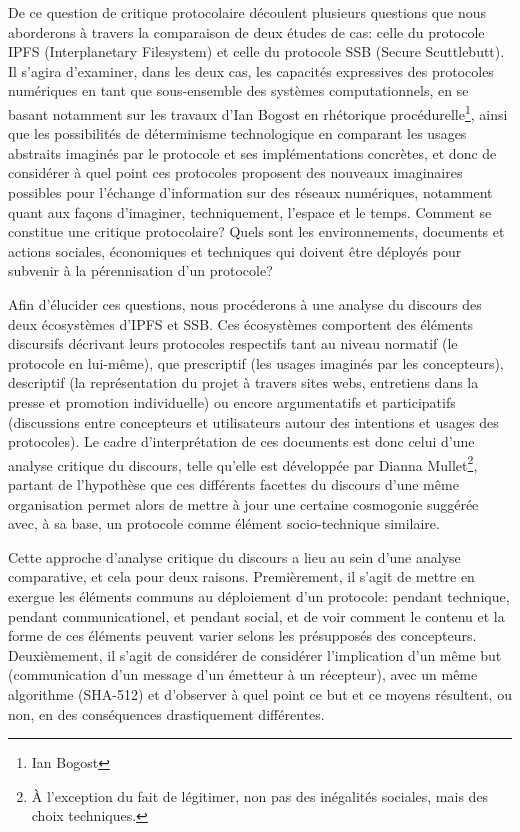 \documentclass{article}
\begin{document}
De ce question de critique protocolaire découlent plusieurs questions que nous aborderons à travers la comparaison de deux études de cas: celle du protocole IPFS (Interplanetary Filesystem) et celle du protocole SSB (Secure Scuttlebutt). Il s'agira d'examiner, dans les deux cas, les capacités expressives des protocoles numériques en tant que sous-ensemble des systèmes computationnels, en se basant notamment sur les travaux d'Ian Bogost en rhétorique procédurelle\footnote{Ian Bogost}, ainsi que les possibilités de déterminisme technologique en comparant les usages abstraits imaginés par le protocole et ses implémentations concrètes, et donc de considérer à quel point ces protocoles proposent des nouveaux imaginaires possibles pour l'échange d'information sur des réseaux numériques, notamment quant aux façons d'imaginer, techniquement, l'espace et le temps. Comment se constitue une critique protocolaire? Quels sont les environnements, documents et actions sociales, économiques et techniques qui doivent être déployés pour subvenir à la pérennisation d'un protocole?

Afin d'élucider ces questions, nous procéderons à une analyse du discours des deux écosystèmes d'IPFS et SSB. Ces écosystèmes comportent des éléments discursifs décrivant leurs protocoles respectifs tant au niveau normatif (le protocole en lui-même), que prescriptif (les usages imaginés par les concepteurs), descriptif (la représentation du projet à travers sites webs, entretiens dans la presse et promotion individuelle) ou encore argumentatifs et participatifs (discussions entre concepteurs et utilisateurs autour des intentions et usages des protocoles). Le cadre d'interprétation de ces documents est donc celui d'une analyse critique du discours, telle qu'elle est développée par Dianna Mullet\footnote{À l'exception du fait de légitimer, non pas des inégalités sociales, mais des choix techniques.}, partant de l'hypothèse que ces différents facettes du discours d'une même organisation permet alors de mettre à jour une certaine cosmogonie suggérée avec, à sa base, un protocole comme élément socio-technique similaire.

Cette approche d'analyse critique du discours a lieu au sein d'une analyse comparative, et cela pour deux raisons. Premièrement, il s'agit de mettre en exergue les éléments communs au déploiement d'un protocole: pendant technique, pendant communicationel, et pendant social, et de voir comment le contenu et la forme de ces éléments peuvent varier selons les présupposés des concepteurs. Deuxièmement, il s'agit de considérer de considérer l'implication d'un même but (communication d'un message d'un émetteur à un récepteur), avec un même algorithme (SHA-512) et d'observer à quel point ce but et ce moyens résultent, ou non, en des conséquences drastiquement différentes.
\end{document}
